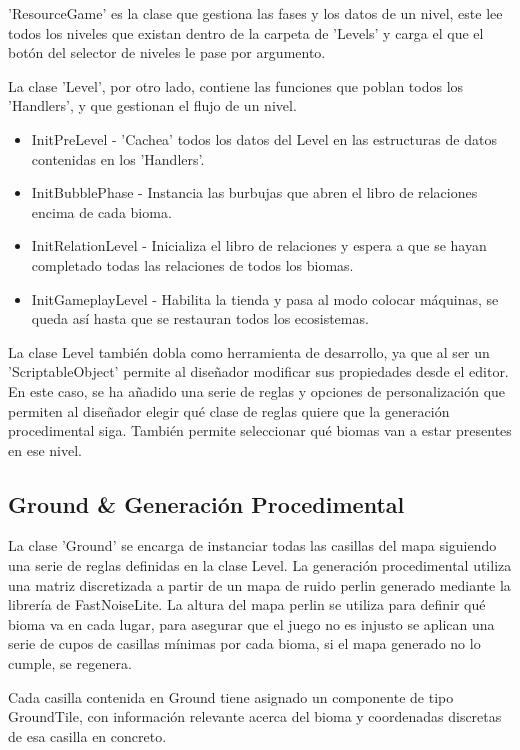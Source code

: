 'ResourceGame' es la clase que gestiona las fases y los datos de un nivel, este lee todos los niveles que existan dentro de la carpeta de 'Levels' y carga el que el botón del selector de niveles le pase por argumento.

La clase 'Level', por otro lado, contiene las funciones que poblan todos los 'Handlers', y que gestionan el flujo de un nivel.
\begin{itemize}
    \item InitPreLevel - 'Cachea' todos los datos del Level en las estructuras de datos contenidas en los 'Handlers'.
    \item InitBubblePhase - Instancia las burbujas que abren el libro de relaciones encima de cada bioma.
    \item InitRelationLevel - Inicializa el libro de relaciones y espera a que se hayan completado todas las relaciones de todos los biomas.
    \item InitGameplayLevel - Habilita la tienda y pasa al modo colocar máquinas, se queda así hasta que se restauran todos los ecosistemas.
\end{itemize}

La clase Level también dobla como herramienta de desarrollo, ya que al ser un 'ScriptableObject' permite al diseñador modificar sus propiedades desde el editor. En este caso, se ha añadido una serie de reglas y opciones de personalización que permiten al diseñador elegir qué clase de reglas quiere que la generación procedimental siga. También permite seleccionar qué biomas van a estar presentes en ese nivel. 

\subsection{Ground \& Generación Procedimental}

La clase 'Ground' se encarga de instanciar todas las casillas del mapa siguiendo una serie de reglas definidas en la clase Level. La generación procedimental utiliza una matriz discretizada a partir de un mapa de ruido perlin generado mediante la librería de FastNoiseLite\cite{FastNoiseLite}. La altura del mapa perlin se utiliza para definir qué bioma va en cada lugar, para asegurar que el juego no es injusto se aplican una serie de cupos de casillas mínimas por cada bioma, si el mapa generado no lo cumple, se regenera.

Cada casilla contenida en Ground tiene asignado un componente de tipo GroundTile, con información relevante acerca del bioma y coordenadas discretas de esa casilla en concreto. 

